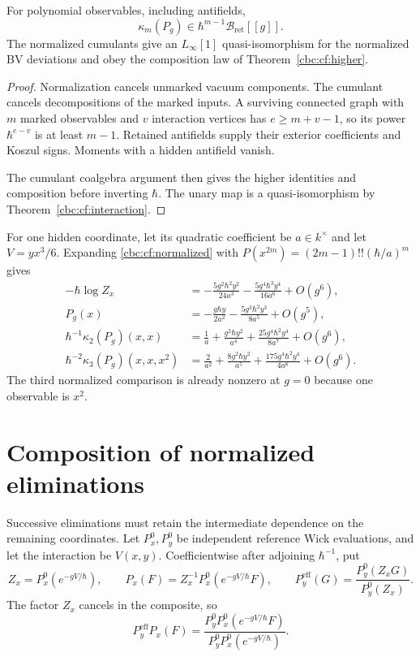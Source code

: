 \begin{corollary}\label{cbc:cf:interacting-cumulants}
For polynomial observables, including antifields,
\[
 \kappa_m(P_g)\in
       \hbar^{m-1}\mathcal B_{\mathrm{ret}}[[g]].
\]
The normalized cumulants give an $L_\infty[1]$
quasi-isomorphism for the normalized BV deviations and obey
the composition law of Theorem~\ref{cbc:cf:higher}.
\end{corollary}
\begin{proof}
Normalization cancels unmarked vacuum components. The cumulant
cancels decompositions of the marked inputs. A surviving
connected graph with $m$ marked observables and $v$ interaction
vertices has $e\geq m+v-1$, so its power $\hbar^{e-v}$
is at least $m-1$. Retained antifields supply their exterior
coefficients and Koszul signs. Moments with a hidden antifield
vanish.

The cumulant coalgebra argument then gives the higher
identities and composition before inverting $\hbar$.
The unary map is a quasi-isomorphism by
Theorem~\ref{cbc:cf:interaction}.
\end{proof}

\begin{example}\label{cbc:cf:cubic}
For one hidden coordinate, let its quadratic coefficient be
$a\in k^\times$ and let $V=yx^3/6$. Expanding
\eqref{cbc:cf:normalized} with
$P(x^{2m})=(2m-1)!!(\hbar/a)^m$ gives
\begin{align*}
 -\hbar\log Z_x
     &=-\frac{5g^2\hbar^2y^2}{24a^3}
       -\frac{5g^4\hbar^3y^4}{16a^6}+O(g^6),\\
 P_g(x)&=-\frac{g\hbar y}{2a^2}
       -\frac{5g^3\hbar^2y^3}{8a^5}+O(g^5),\\
 \hbar^{-1}\kappa_2(P_g)(x,x)
       &=\frac1a+\frac{g^2\hbar y^2}{a^4}
                  +\frac{25g^4\hbar^2y^4}{8a^7}+O(g^6),\\
 \hbar^{-2}\kappa_3(P_g)(x,x,x^2)
       &=\frac2{a^2}+\frac{8g^2\hbar y^2}{a^5}
                  +\frac{175g^4\hbar^2y^4}{4a^8}+O(g^6).
\end{align*}
The third normalized comparison is already nonzero at $g=0$
because one observable is $x^2$.
\end{example}

\section{Composition of normalized eliminations}
\label{cbc:cf:sewing}

Successive eliminations must retain the intermediate dependence
on the remaining coordinates. Let $P_x^0,P_y^0$ be independent
reference Wick evaluations, and let the interaction be $V(x,y)$.
Coefficientwise after adjoining $\hbar^{-1}$, put
\[
 Z_x=P_x^0(e^{-gV/\hbar}),\qquad
 P_x(F)=Z_x^{-1}P_x^0(e^{-gV/\hbar}F),\qquad
 P_y^{\mathrm{eff}}(G)
       =\frac{P_y^0(Z_xG)}{P_y^0(Z_x)}.
\]
The factor $Z_x$ cancels in the composite, so
\[
 P_y^{\mathrm{eff}}P_x(F)=
 \frac{P_y^0P_x^0(e^{-gV/\hbar}F)}
      {P_y^0P_x^0(e^{-gV/\hbar})}.
\]

